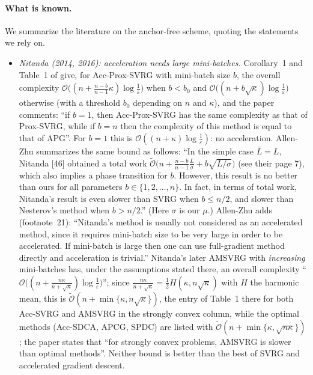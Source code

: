 \paragraph{What is known.} We summarize the literature on the anchor-free scheme, quoting the statements we rely on.
\begin{itemize}
\item \emph{Nitanda (2014, 2016): acceleration needs large mini-batches.} Corollary~1 and Table~1 of \cite{nitanda2014stochastic} give, for Acc-Prox-SVRG with mini-batch size $b$, the overall complexity $\mathcal O\big((n+\frac{n-b}{n-1}\kappa)\log\frac1\varepsilon\big)$ when $b<b_0$ and $\mathcal O\big((n+b\sqrt\kappa)\log\frac1\varepsilon\big)$ otherwise (with a threshold $b_0$ depending on $n$ and $\kappa$), and the paper comments: ``if $b=1$, then Acc-Prox-SVRG has the same complexity as that of Prox-SVRG, while if $b=n$ then the complexity of this method is equal to that of APG''. For $b=1$ this is $\mathcal O((n+\kappa)\log\frac1\varepsilon)$: no acceleration. Allen-Zhu \cite[Remark~5.7]{allenzhu2018katyusha} summarizes the same bound as follows: ``In the simple case $\bar L=L$, Nitanda [46] obtained a total work $\tilde{\mathcal O}\big(n+\frac{n-b}{n-1}\frac L\sigma+b\sqrt{L/\sigma}\big)$ (see their page 7), which also implies a phase transition for $b$. However, this result is no better than ours for all parameters $b\in\{1,2,\dots,n\}$. In fact, in terms of total work, Nitanda's result is even slower than SVRG when $b\le n/2$, and slower than Nesterov's method when $b>n/2$.'' (Here $\sigma$ is our $\mu$.) Allen-Zhu adds (footnote~21): ``Nitanda's method is usually not considered as an accelerated method, since it requires mini-batch size to be very large in order to be accelerated. If mini-batch is large then one can use full-gradient method directly and acceleration is trivial.'' Nitanda's later AMSVRG \cite[Theorem~3]{nitanda2016accelerated} with \emph{increasing} mini-batches has, under the assumptions stated there, an overall complexity ``$\mathcal O\big((n+\frac{n\kappa}{n+\sqrt\kappa})\log\frac1\varepsilon\big)$''; since $\frac{n\kappa}{n+\sqrt\kappa}=\frac12H(\kappa,n\sqrt\kappa)$ with $H$ the harmonic mean, this is $\tilde{\mathcal O}(n+\min\{\kappa,n\sqrt\kappa\})$, the entry of Table~1 there for both Acc-SVRG and AMSVRG in the strongly convex column, while the optimal methods (Acc-SDCA, APCG, SPDC) are listed with $\tilde{\mathcal O}(n+\min\{\kappa,\sqrt{n\kappa}\})$; the paper states that ``for strongly convex problems, AMSVRG is slower than optimal methods''. Neither bound is better than the best of SVRG and accelerated gradient descent.

\end{itemize}
